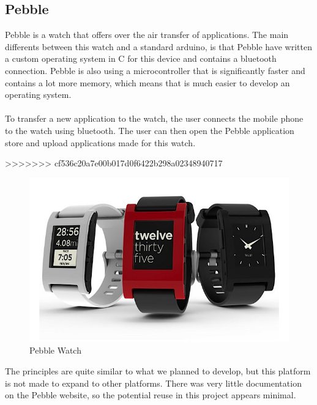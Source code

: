 \subsection{Pebble}
Pebble is a watch that offers over the air transfer of applications. The main differents between this watch and a standard arduino, is that Pebble have written a custom operating system in C for this device and contains a bluetooth connection. Pebble is also using a microcontroller that is significantly faster and contains a lot more memory, which means that is much easier to develop an operating system.\\
\\
To transfer a new application to the watch, the user connects the mobile phone to the watch using bluetooth. The user can then open the Pebble application store and upload applications made for this watch.

>>>>>>> cf536c20a7e00b017d0f6422b298a02348940717

\begin{figure}[H]
\includegraphics[scale=0.7]{images/Pebble-Smartphone-Watch.jpeg}
\caption{Pebble Watch}
\end{figure}
The principles are quite similar to what we planned to develop, but this platform is not made to expand to other platforms. There was very little documentation on the Pebble website, so the potential reuse in this project appears minimal.

